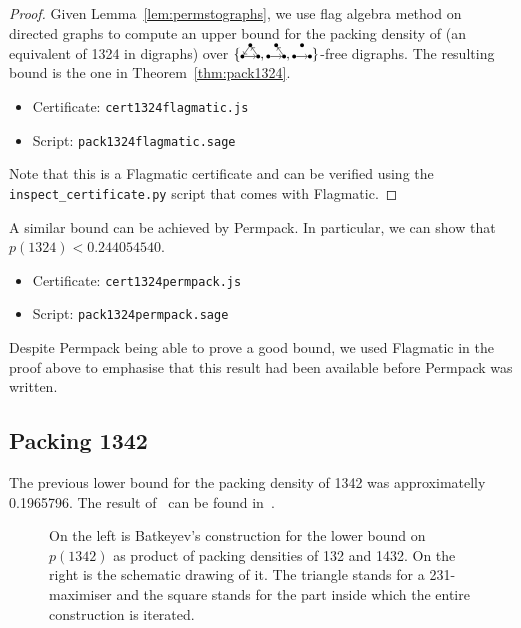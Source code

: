 \begin{proof}
Given Lemma~\ref{lem:permstographs}, we use flag algebra method on directed graphs to compute an upper bound for the packing density of \digraphacbd (an equivalent of 1324 in digraphs) over $\{\dicycle, \twochain, \orcocherry\}$-free digraphs. The resulting bound is the one in Theorem~\ref{thm:pack1324}.
\begin{itemize}
\item Certificate: \texttt{cert1324flagmatic.js}
\item Script: \texttt{pack1324flagmatic.sage}
\end{itemize}
Note that this is a Flagmatic certificate and can be verified using the \texttt{inspect\_certificate.py} script that comes with Flagmatic.


\end{proof}

A similar bound can be achieved by Permpack. In particular, we can show that $p(1324)< 0.244054540$.
\begin{itemize}
\item Certificate: \texttt{cert1324permpack.js}
\item Script: \texttt{pack1324permpack.sage}
\end{itemize}
Despite Permpack being able to prove a good bound, we used Flagmatic in the proof above to emphasise that this result had been available before Permpack was written. 


\subsection{Packing 1342}
\label{sec:pack1342}

The previous lower bound for the packing density of 1342 was approximatelly 0.1965796. The result of~\cite{batkeyev} can be found in~\cite{albert2002packing}.

\begin{figure}[ht]
\centering \acdbmax
\caption{\small On the left is Batkeyev's construction for the lower bound on $p(1342)$ as product of packing densities of 132 and 1432. On the right is the schematic drawing of it. The triangle stands for a 231-maximiser and the square stands for the part inside which the entire construction is iterated.}
\label{fig:batkeyev}
\end{figure}

